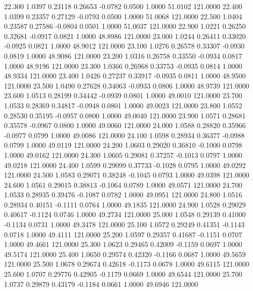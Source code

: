   22.300   1.0397   0.23118   0.26653  -0.0782   0.0500   1.0000  51.0102 121.0000
  22.400   1.0399   0.23357   0.27129  -0.0793   0.0500   1.0000  51.0068 121.0000
  22.500   1.0404   0.23587   0.27586  -0.0804   0.0501   1.0000  51.0037 121.0000
  22.900   1.0221   0.26250   0.32681  -0.0917   0.0821   1.0000  48.8986 121.0000
  23.000   1.0244   0.26411   0.33020  -0.0925   0.0821   1.0000  48.9012 121.0000
  23.100   1.0276   0.26578   0.33307  -0.0930   0.0819   1.0000  48.9086 121.0000
  23.200   1.0316   0.26758   0.33550  -0.0934   0.0817   1.0000  48.9196 121.0000
  23.300   1.0366   0.26968   0.33753  -0.0935   0.0814   1.0000  48.9334 121.0000
  23.400   1.0426   0.27237   0.33917  -0.0935   0.0811   1.0000  48.9500 121.0000
  23.500   1.0490   0.27628   0.34063  -0.0933   0.0806   1.0000  48.9739 121.0000
  23.600   1.0513   0.28199   0.34442  -0.0939   0.0801   1.0000  49.0010 121.0000
  23.700   1.0533   0.28369   0.34817  -0.0948   0.0801   1.0000  49.0023 121.0000
  23.800   1.0552   0.28530   0.35195  -0.0957   0.0800   1.0000  49.0040 121.0000
  23.900   1.0571   0.28681   0.35578  -0.0967   0.0800   1.0000  49.0060 121.0000
  24.000   1.0588   0.28820   0.35966  -0.0977   0.0799   1.0000  49.0086 121.0000
  24.100   1.0598   0.28934   0.36377  -0.0988   0.0799   1.0000  49.0119 121.0000
  24.200   1.0603   0.29020   0.36810  -0.1000   0.0798   1.0000  49.0162 121.0000
  24.300   1.0605   0.29081   0.37257  -0.1013   0.0797   1.0000  49.0218 121.0000
  24.400   1.0599   0.29099   0.37733  -0.1028   0.0795   1.0000  49.0292 121.0000
  24.500   1.0583   0.29071   0.38248  -0.1045   0.0793   1.0000  49.0398 121.0000
  24.600   1.0561   0.29015   0.38813  -0.1064   0.0789   1.0000  49.0571 121.0000
  24.700   1.0533   0.28935   0.39476  -0.1087   0.0782   1.0000  49.0951 121.0000
  24.800   1.0516   0.28934   0.40151  -0.1111   0.0764   1.0000  49.1835 121.0000
  24.900   1.0528   0.29029   0.40617  -0.1124   0.0746   1.0000  49.2734 121.0000
  25.000   1.0548   0.29139   0.41000  -0.1134   0.0731   1.0000  49.3478 121.0000
  25.100   1.0572   0.29249   0.41351  -0.1143   0.0718   1.0000  49.4111 121.0000
  25.200   1.0597   0.29357   0.41687  -0.1151   0.0707   1.0000  49.4661 121.0000
  25.300   1.0623   0.29465   0.42009  -0.1159   0.0697   1.0000  49.5174 121.0000
  25.400   1.0650   0.29574   0.42320  -0.1166   0.0687   1.0000  49.5659 121.0000
  25.500   1.0678   0.29674   0.42618  -0.1173   0.0678   1.0000  49.6115 121.0000
  25.600   1.0707   0.29776   0.42905  -0.1179   0.0669   1.0000  49.6544 121.0000
  25.700   1.0737   0.29879   0.43179  -0.1184   0.0661   1.0000  49.6946 121.0000
